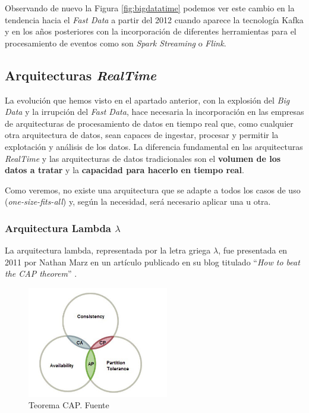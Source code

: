 Observando de nuevo la Figura \ref{fig:bigdatatime} podemos ver este cambio en la tendencia hacia el \textit{Fast Data} a partir del 2012 cuando aparece la tecnología Kafka y en los años posteriores con la incorporación de diferentes herramientas para el procesamiento de eventos como son \textit{Spark Streaming} o \textit{Flink}.

\subsection{Arquitecturas \textit{RealTime}}
La evolución que hemos visto en el apartado anterior,  con la explosión del \textit{Big Data} y la irrupción del \textit{Fast Data}, hace necesaria la incorporación en las empresas de arquitecturas de procesamiento de datos en tiempo real que, como cualquier otra arquitectura de datos, sean capaces de ingestar, procesar y permitir la explotación y análisis de los datos. La diferencia fundamental en las arquitecturas \textit{RealTime} y las arquitecturas de datos tradicionales son el\textbf{ volumen de los datos a tratar} y la \textbf{capacidad para hacerlo en tiempo real}.

Como veremos, no existe una arquitectura que se adapte a todos los casos de uso (\textit{one-size-fits-all}) y, según la necesidad, será necesario aplicar una u otra.

\subsubsection{Arquitectura Lambda $\lambda$}
La arquitectura lambda, representada por la letra griega $\lambda$, fue presentada en 2011 por Nathan Marz en un artículo publicado en su blog titulado ``\textit{How to beat the CAP theorem}'' \cite{lambda}.

\begin{figure}[!ht]
	\centering
	\includegraphics[width=0.55\textwidth]{images/arte/cap}
	\caption{Teorema CAP. Fuente \cite{cap}}
	\label{fig:cap}
\end{figure}

